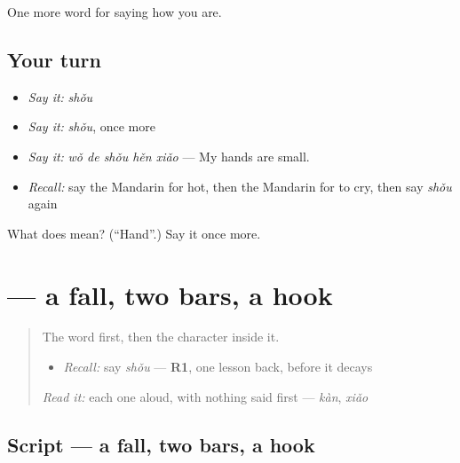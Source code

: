 \begin{grammarlens}[title={What you've built}]
One more word for saying how you are.
\end{grammarlens}

\subsection*{Your turn}
\begin{itemize}
\raggedright
  \item \emph{Say it:} \emph{shǒu}
  \item \emph{Say it:} \emph{shǒu}, once more
  \item \emph{Say it:} \emph{wǒ de shǒu hěn xiǎo} — My hands are small.
  \item \emph{Recall:} say the Mandarin for hot, then the Mandarin for to cry, then say \emph{shǒu} again
\end{itemize}

\begin{tcolorbox}[breakable,colback=teal!4,colframe=teal!35!black,title={Before you move on}]
What does  mean? (\textquotedblleft{}Hand\textquotedblright{}.) Say it once more.
\end{tcolorbox}
\section[\texorpdfstring{\zh{手} (shǒu)}{手 (shǒu)}]{ — a fall, two bars, a hook}

\label{lesson:ZH-W52-shou}



\begin{quote}
The word first, then the character inside it.

\begin{itemize}
\raggedright
  \item \emph{Recall:} say \emph{shǒu} — \textbf{R1}, one lesson back, before it decays
\end{itemize}

\begin{quote}
 
\end{quote}

\emph{Read it:} each one aloud, with nothing said first — \emph{kàn}, \emph{xiǎo}
\end{quote}

\subsection*{Script — a fall, two bars, a hook}

